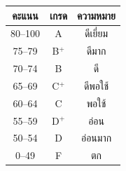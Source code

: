 \begin{table}[h]
    \centering
    \begin{tabular}{ccc}
        \hline
        \textbf{คะแนน} & \textbf{เกรด} & \textbf{ความหมาย} \\
        \hline
        80--100  & A   & ดีเยี่ยม   \\
        75--79   & B$^{+}$ & ดีมาก  \\
        70--74   & B   & ดี         \\
        65--69   & C$^{+}$ & ดีพอใช้ \\
        60--64   & C   & พอใช้      \\
        55--59   & D$^{+}$ & อ่อน    \\
        50--54   & D   & อ่อนมาก   \\
        0--49    & F   & ตก         \\
        \hline
    \end{tabular}
\end{table}


